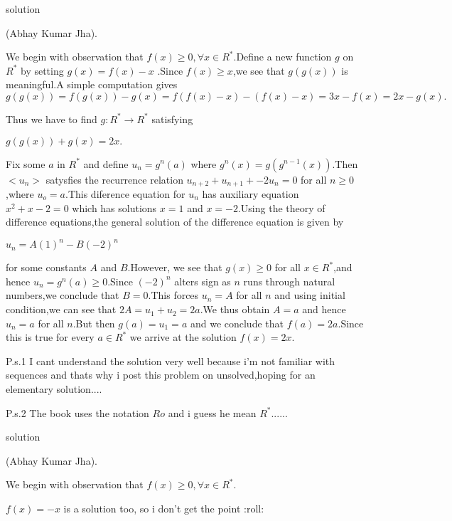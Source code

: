 \begin{solution}
	\begin{italicized}solution\end{italicized} (Abhay Kumar Jha).

We begin with observation that $ f(x)\ge 0,\forall x\in R^*$.Define a new function $ g$ on $ R^*$ by setting $ g(x) = f(x) - x$ .Since $ f(x)\ge x$,we see that $ g(g(x))$ is meaningful.A simple computation gives $ g(g(x)) = f(g(x)) - g(x) = f(f(x) - x) - (f(x) - x) = 3x - f(x) = 2x - g(x).$

Thus we have to find $ g: R^* \to R^*$ satisfying

$ g(g(x)) + g(x) = 2x.$

Fix some $ a$ in $ R^*$ and define $ u_n = g^n(a)$ where $ g^n(x) = g(g^{n - 1}(x)).$Then $ < u_n >$ satysfies the recurrence relation $ u_{n + 2} + u_{n + 1} + - 2u_n = 0$ for all $ n \ge 0$,where $ u_o = a$.This diference equation for $ u_n$ has auxiliary equation $ x^2 + x - 2 = 0$ which has solutions $ x = 1$ and $ x = - 2$.Using the theory of difference equations,the general solution of the difference equation is given by

$ u_n = A(1)^n - B( - 2)^n$

for some constants $ A$ and $ B$.However, we see that $ g(x)\ge 0$ for all $ x\in R^*$,and hence $ u_n = g^n(a) \ge 0$.Since $ ( - 2)^n$ alters sign as $ n$ runs through natural numbers,we conclude that $ B = 0$.This forces $ u_n = A$ for all $ n$ and using initial condition,we can see that $ 2A = u_1 + u_2 = 2a$.We thus obtain $ A = a$ and hence $ u_n = a$ for all $ n$.But then $ g(a) = u_1 = a$ and we conclude that $ f(a) = 2a$.Since this is true for every $ a\in R^*$ we arrive at the solution $ f(x) = 2x$.

P.s.1
I cant understand the solution very well because i'm not familiar with sequences and thats why i post this problem on unsolved,hoping for an elementary solution....

P.s.2
The book uses the notation $ Ro$ and i guess he mean $ R^*$......
\end{solution}



\begin{solution}
	\begin{tcolorbox}\begin{italicized}solution\end{italicized} (Abhay Kumar Jha).

We begin with observation that $ f(x)\ge 0,\forall x\in R^*$.\end{tcolorbox}
$ f(x) = -x$ is a solution too, so i don't get the point  :roll:
\end{solution}



